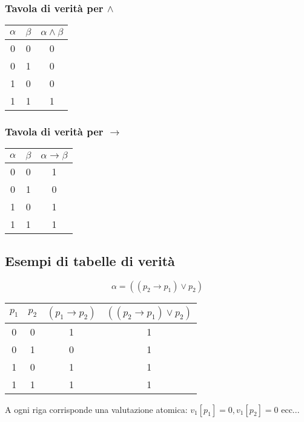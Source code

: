 \documentclass{article}
\theoremstyle{break}
\theoremstyle{break}
\theoremstyle{break}
\theoremstyle{break}
\begin{document}
\subsubsection{Tavola di verità per \( \wedge \) }
\begin{center}
	\begin{tabular}{c|c|c}
		\( \alpha \) & \( \beta \) & \( \alpha \wedge \beta \) \\
		\hline
		0            & 0           & 0                         \\
		0            & 1           & 0                         \\
		1            & 0           & 0                         \\
		1            & 1           & 1                         \\
	\end{tabular}
\end{center}

\subsubsection{Tavola di verità per \( \to  \) }
\begin{center}
	\begin{tabular}{c|c|c}
		\( \alpha \) & \( \beta \) & \( \alpha \to \beta \) \\
		\hline
		0            & 0           & 1                      \\
		0            & 1           & 0                      \\
		1            & 0           & 1                      \\
		1            & 1           & 1                      \\
	\end{tabular}
\end{center}

\subsection{Esempi di tabelle di verità}
\begin{example}
	\[
		\alpha = ((p_2 \to  p_1)\vee p_2)
	\]
	\begin{center}
		\begin{tabular}{c|c|c|c}
			\( p_1 \) & \( p_2 \) & \( (p_1 \to p_2) \) & \( ((p_2 \to  p_1)\vee p_2) \) \\
			\hline
			0         & 0         & 1                   & 1                              \\
			0         & 1         & 0                   & 1                              \\
			1         & 0         & 1                   & 1                              \\
			1         & 1         & 1                   & 1                              \\
		\end{tabular}
	\end{center}
	A ogni riga corrisponde una valutazione atomica: \( v_1[p_1] = 0, v_1[p_2] = 0 \) ecc...
\end{example}
\end{document}
